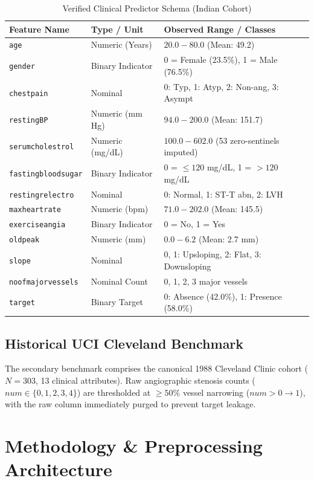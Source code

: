 \documentclass[journal]{IEEEtran}
\begin{document}
\begin{table}[htbp]
\caption{Verified Clinical Predictor Schema (Indian Cohort)}
\label{tab:india_schema}
\centering
\begin{tabular}{lll}
\toprule
\textbf{Feature Name} & \textbf{Type / Unit} & \textbf{Observed Range / Classes} \\
\midrule
\texttt{age} & Numeric (Years) & $20.0 - 80.0$ (Mean: 49.2) \\
\texttt{gender} & Binary Indicator & 0 = Female (23.5\%), 1 = Male (76.5\%) \\
\texttt{chestpain} & Nominal & 0: Typ, 1: Atyp, 2: Non-ang, 3: Asympt \\
\texttt{restingBP} & Numeric (mm Hg) & $94.0 - 200.0$ (Mean: 151.7) \\
\texttt{serumcholestrol} & Numeric (mg/dL) & $100.0 - 602.0$ (53 zero-sentinels imputed) \\
\texttt{fastingbloodsugar} & Binary Indicator & 0 = $\le 120$ mg/dL, 1 = $>120$ mg/dL \\
\texttt{restingrelectro} & Nominal & 0: Normal, 1: ST-T abn, 2: LVH \\
\texttt{maxheartrate} & Numeric (bpm) & $71.0 - 202.0$ (Mean: 145.5) \\
\texttt{exerciseangia} & Binary Indicator & 0 = No, 1 = Yes \\
\texttt{oldpeak} & Numeric (mm) & $0.0 - 6.2$ (Mean: 2.7 mm) \\
\texttt{slope} & Nominal & 0, 1: Upsloping, 2: Flat, 3: Downsloping \\
\texttt{noofmajorvessels} & Nominal Count & 0, 1, 2, 3 major vessels \\
\midrule
\texttt{target} & Binary Target & 0: Absence (42.0\%), 1: Presence (58.0\%) \\
\bottomrule
\end{tabular}
\end{table}

\subsection{Historical UCI Cleveland Benchmark}
The secondary benchmark comprises the canonical 1988 Cleveland Clinic cohort ($N=303$, 13 clinical attributes). Raw angiographic stenosis counts ($num \in \{0,1,2,3,4\}$) are thresholded at $\ge 50\%$ vessel narrowing ($num > 0 \rightarrow 1$), with the raw column immediately purged to prevent target leakage.

\section{Methodology \& Preprocessing Architecture}
\end{document}

